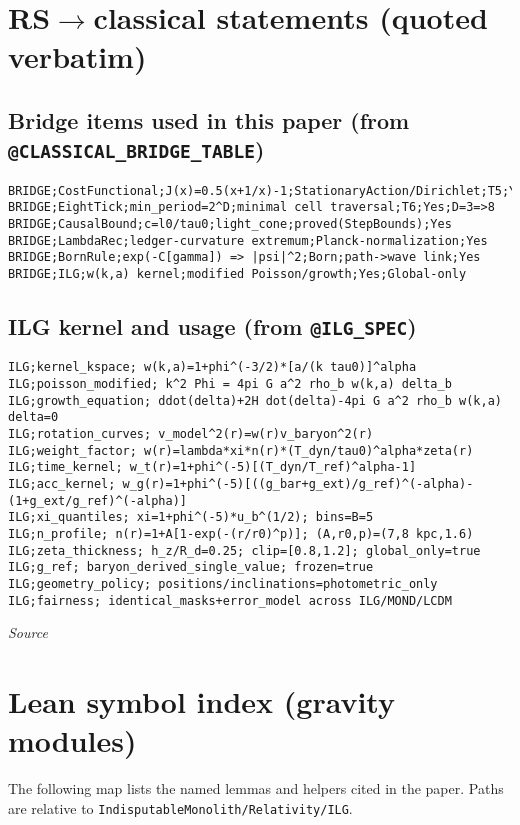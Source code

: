 \documentclass[12pt,a4paper]{article}
\begin{document}
\section{RS$\to$classical statements (quoted verbatim)}
\label{app:bridge-verbatim}
\subsection*{Bridge items used in this paper (from \texttt{@CLASSICAL\_BRIDGE\_TABLE})}
\begin{verbatim}
BRIDGE;CostFunctional;J(x)=0.5(x+1/x)-1;StationaryAction/Dirichlet;T5;Yes
BRIDGE;EightTick;min_period=2^D;minimal cell traversal;T6;Yes;D=3=>8
BRIDGE;CausalBound;c=l0/tau0;light_cone;proved(StepBounds);Yes
BRIDGE;LambdaRec;ledger-curvature extremum;Planck-normalization;Yes
BRIDGE;BornRule;exp(-C[gamma]) => |psi|^2;Born;path->wave link;Yes
BRIDGE;ILG;w(k,a) kernel;modified Poisson/growth;Yes;Global-only
\end{verbatim}

\subsection*{ILG kernel and usage (from \texttt{@ILG\_SPEC})}
\begin{verbatim}
ILG;kernel_kspace; w(k,a)=1+phi^(-3/2)*[a/(k tau0)]^alpha
ILG;poisson_modified; k^2 Phi = 4pi G a^2 rho_b w(k,a) delta_b
ILG;growth_equation; ddot(delta)+2H dot(delta)-4pi G a^2 rho_b w(k,a) delta=0
ILG;rotation_curves; v_model^2(r)=w(r)v_baryon^2(r)
ILG;weight_factor; w(r)=lambda*xi*n(r)*(T_dyn/tau0)^alpha*zeta(r)
ILG;time_kernel; w_t(r)=1+phi^(-5)[(T_dyn/T_ref)^alpha-1]
ILG;acc_kernel; w_g(r)=1+phi^(-5)[((g_bar+g_ext)/g_ref)^(-alpha)-(1+g_ext/g_ref)^(-alpha)]
ILG;xi_quantiles; xi=1+phi^(-5)*u_b^(1/2); bins=B=5
ILG;n_profile; n(r)=1+A[1-exp(-(r/r0)^p)]; (A,r0,p)=(7,8 kpc,1.6)
ILG;zeta_thickness; h_z/R_d=0.25; clip=[0.8,1.2]; global_only=true
ILG;g_ref; baryon_derived_single_value; frozen=true
ILG;geometry_policy; positions/inclinations=photometric_only
ILG;fairness; identical_masks+error_model across ILG/MOND/LCDM
\end{verbatim}
\noindent\emph{Source}

\section{Lean symbol index (gravity modules)}
\label{app:lean-index}
The following map lists the named lemmas and helpers cited in the paper. Paths are relative to \texttt{IndisputableMonolith/Relativity/ILG}.
\end{document}
